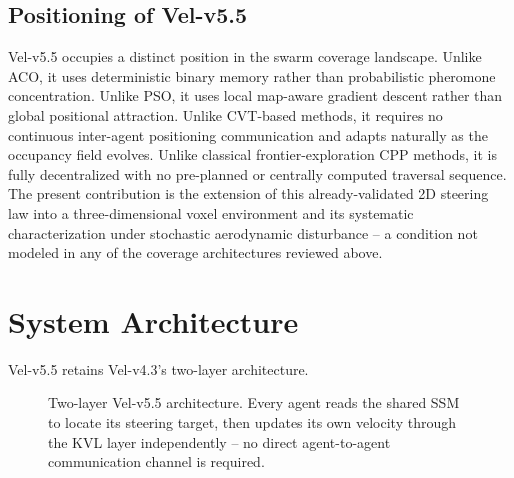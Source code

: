 \documentclass[10pt,journal]{IEEEtran}
\begin{document}
\subsection{Positioning of Vel-v5.5}
Vel-v5.5 occupies a distinct position in the swarm coverage landscape.
Unlike ACO, it uses deterministic binary memory rather than probabilistic
pheromone concentration. Unlike PSO, it uses local map-aware gradient
descent rather than global positional attraction. Unlike CVT-based
methods, it requires no continuous inter-agent positioning communication
and adapts naturally as the occupancy field evolves. Unlike classical
frontier-exploration CPP methods, it is fully decentralized with no
pre-planned or centrally computed traversal sequence. The present
contribution is the extension of this already-validated 2D steering law
into a three-dimensional voxel environment and its systematic
characterization under stochastic aerodynamic disturbance -- a condition
not modeled in any of the coverage architectures reviewed above.

\section{System Architecture}
\label{sec:architecture}

Vel-v5.5 retains Vel-v4.3's two-layer architecture.

\begin{figure}[t]
\centering
{}
\caption{Two-layer Vel-v5.5 architecture. Every agent reads the shared SSM
to locate its steering target, then updates its own velocity through the
KVL layer independently -- no direct agent-to-agent communication channel
is required.}
\label{fig:architecture}
\end{figure}
\end{document}

